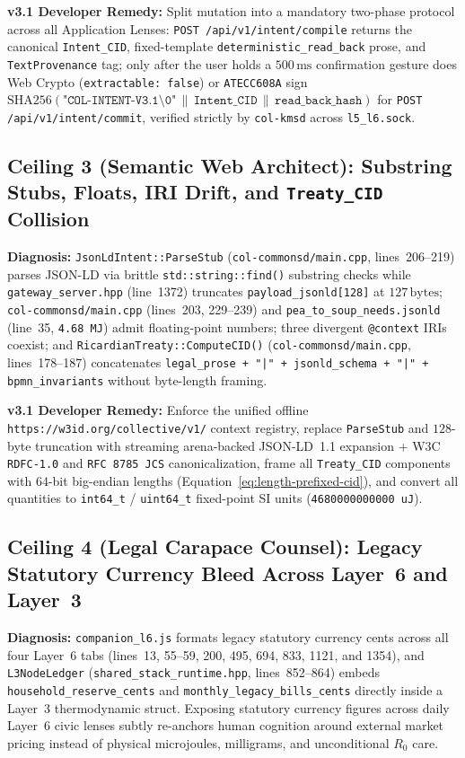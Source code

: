 \textbf{v3.1 Developer Remedy:} Split mutation into a mandatory two-phase protocol across all Application Lenses: \texttt{POST /api/v1/intent/compile} returns the canonical \texttt{Intent\_CID}, fixed-template \texttt{deterministic\_read\_back} prose, and \texttt{TextProvenance} tag; only after the user holds a $500\,\mathrm{ms}$ confirmation gesture does Web Crypto (\texttt{extractable: false}) or \texttt{ATECC608A} sign $\mathrm{SHA256}(\texttt{"COL-INTENT-V3.1\textbackslash0"} \,\|\, \texttt{Intent\_CID} \,\|\, \texttt{read\_back\_hash})$ for \texttt{POST /api/v1/intent/commit}, verified strictly by \texttt{col-kmsd} across \texttt{l5\_l6.sock}.

\subsection{Ceiling 3 (Semantic Web Architect): Substring Stubs, Floats, IRI Drift, and \texttt{Treaty\_CID} Collision}
\textbf{Diagnosis:} \texttt{JsonLdIntent::ParseStub} (\texttt{col-commonsd/main.cpp}, lines~206--219) parses JSON-LD via brittle \texttt{std::string::find()} substring checks while \texttt{gateway\_server.hpp} (line~1372) truncates \texttt{payload\_jsonld[128]} at $127\,\mathrm{bytes}$; \texttt{col-commonsd/main.cpp} (lines~203, 229--239) and \texttt{pea\_to\_soup\_needs.jsonld} (line~35, \texttt{4.68 MJ}) admit floating-point numbers; three divergent \texttt{@context} IRIs coexist; and \texttt{RicardianTreaty::ComputeCID()} (\texttt{col-commonsd/main.cpp}, lines~178--187) concatenates \texttt{legal\_prose + "|" + jsonld\_schema + "|" + bpmn\_invariants} without byte-length framing.

\textbf{v3.1 Developer Remedy:} Enforce the unified offline \texttt{https://w3id.org/collective/v1/} context registry, replace \texttt{ParseStub} and $128$-byte truncation with streaming arena-backed JSON-LD~1.1 expansion + W3C \texttt{RDFC-1.0} and \texttt{RFC 8785 JCS} canonicalization, frame all \texttt{Treaty\_CID} components with 64-bit big-endian lengths (Equation~\ref{eq:length-prefixed-cid}), and convert all quantities to \texttt{int64\_t} / \texttt{uint64\_t} fixed-point SI units (\texttt{4680000000000 uJ}).

\subsection{Ceiling 4 (Legal Carapace Counsel): Legacy Statutory Currency Bleed Across Layer~6 and Layer~3}
\textbf{Diagnosis:} \texttt{companion\_l6.js} formats legacy statutory currency cents across all four Layer~6 tabs (lines~13, 55--59, 200, 495, 694, 833, 1121, and 1354), and \texttt{L3NodeLedger} (\texttt{shared\_stack\_runtime.hpp}, lines~852--864) embeds \texttt{household\_reserve\_cents} and \texttt{monthly\_legacy\_bills\_cents} directly inside a Layer~3 thermodynamic struct. Exposing statutory currency figures across daily Layer~6 civic lenses subtly re-anchors human cognition around external market pricing instead of physical microjoules, milligrams, and unconditional $R_0$ care.

